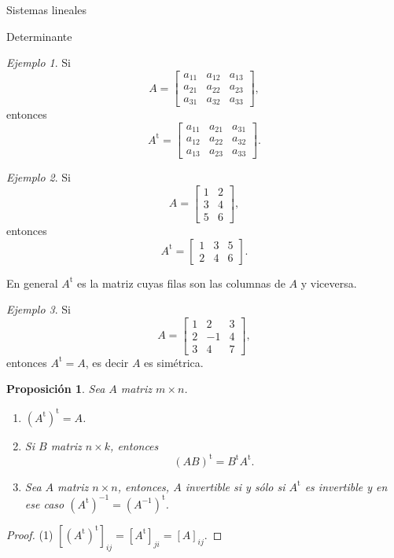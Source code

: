 \documentclass[a4paper,12pt,twoside,spanish,reqno]{amsbook}
\numberwithin{equation}{section}
\newtheorem{proposicion}[teorema]{Proposici\'on}
\theoremstyle{definition}
\theoremstyle{remark}
\newtheorem*{ejemplo*}{Ejemplo}
\renewcommand{\t}{{\operatorname{t}}}
\begin{document}
\begin{chapter}{Sistemas lineales}
\begin{section}{Determinante}
    \begin{ejemplo*} Si
        $$A=\begin{bmatrix}a_{11}&a_{12}&a_{13}\\a_{21}&a_{22}&a_{23}\\a_{31}&a_{32}&a_{33}\end{bmatrix},$$ 
        entonces
        $$A^\t=\begin{bmatrix}a_{11}&a_{21}&a_{31}\\a_{12}&a_{22}&a_{32}\\a_{13}&a_{23}&a_{33}\end{bmatrix}.$$ 
    \end{ejemplo*}
    
    \begin{ejemplo*}
        Si $$A=\begin{bmatrix}1&2\\3&4\\5&6\end{bmatrix},$$ 
        entonces
        $$A^\t=\begin{bmatrix}1&3&5\\2&4&6\end{bmatrix}.$$ 
    \end{ejemplo*}
    
    
    En  general $A^\t$ es la matriz cuyas filas son las columnas de $A$ y viceversa. 
    
    \begin{ejemplo*}
        Si 
        \begin{equation*}
            A=\begin{bmatrix}1&2&3\\2&-1&4\\3&4&7\end{bmatrix},
        \end{equation*}
        entonces $A^\t =A$, es decir  $A$ es simétrica.
    \end{ejemplo*}
    
    \begin{proposicion}\label{prop-matriz-transpuesta} Sea $A$ matriz $m \times n$.
        \begin{enumerate}
            \item $(A^\t)^\t = A$.
            \item  Si $B$ matriz $n \times k$,  entonces
            \begin{equation*}
            (AB)^\t = B^\t A^\t.
            \end{equation*} 
            \item  Sea $A$ matriz $n \times n$, entonces, $A$ invertible si y sólo si  $A^\t$ es invertible y  en ese caso $(A^\t)^{-1} = (A^{-1})^\t$.
        \end{enumerate}
    \end{proposicion}
    \begin{proof}
        (1) 	$[(A^\t)^\t]_{ij} = [A^\t]_{ji} = [A]_{ij}$. 
        

\end{proof}
\end{section}
\end{chapter}
\end{document}
